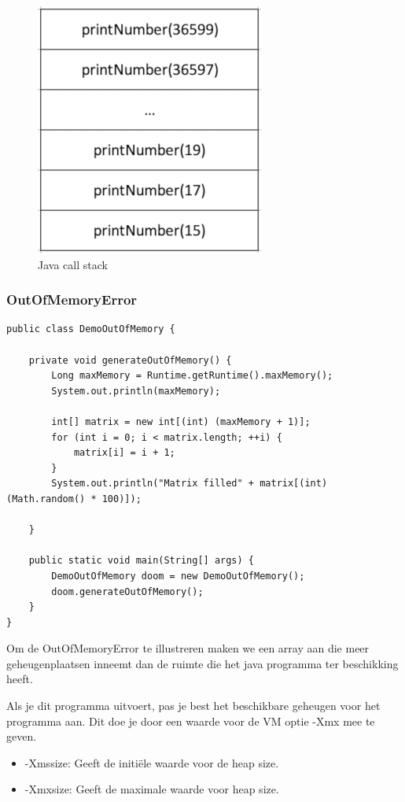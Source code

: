 \documentclass{tstextbook}
\begin{document}
\begin{figure}[H]
\includegraphics{images/h2/java_call_stack.png}
\caption{Java call stack}
\label{fig:call_stack}
\end{figure}


\subsubsection{OutOfMemoryError}

\begin{lstlisting}
public class DemoOutOfMemory {

	private void generateOutOfMemory() {
		Long maxMemory = Runtime.getRuntime().maxMemory();
		System.out.println(maxMemory);

		int[] matrix = new int[(int) (maxMemory + 1)];
		for (int i = 0; i < matrix.length; ++i) {
			matrix[i] = i + 1;
		}
		System.out.println("Matrix filled" + matrix[(int)(Math.random() * 100)]);

	}

	public static void main(String[] args) {
		DemoOutOfMemory doom = new DemoOutOfMemory();
		doom.generateOutOfMemory();
	}
}
\end{lstlisting}

Om de OutOfMemoryError te illustreren maken we een array aan die meer geheugenplaatsen inneemt dan de ruimte die het java programma ter beschikking heeft.

Als je dit programma uitvoert, pas je best het beschikbare geheugen voor het programma aan. Dit doe je door een waarde voor de VM optie -Xmx mee te geven.

\begin{itemize}
\item -Xmssize: Geeft de initi\"ele waarde voor de heap size.
\item -Xmxsize: Geeft de maximale waarde voor heap size.
\end{itemize}
\end{document}
